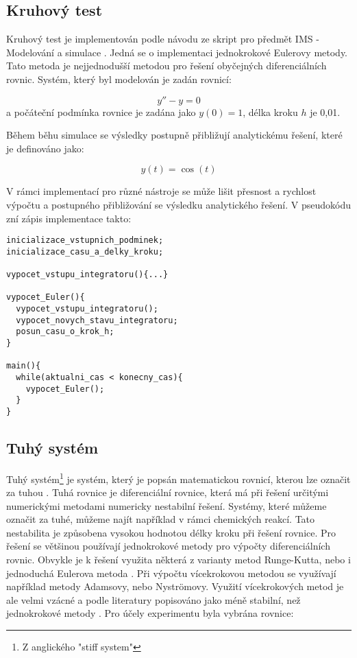 \subsection{Kruhový test}
\label{kruhovy-test}

Kruhový test je implementován podle návodu ze skript pro předmět IMS - Modelování a simulace \cite{IMS-skripta}. Jedná se o implementaci jednokrokové Eulerovy metody. Tato metoda je nejjednodušší metodou pro řešení obyčejných diferenciálních rovnic. Systém, který byl modelován je zadán rovnicí:

\begin{equation}
   y'' - y = 0 
\end{equation}
a počáteční podmínka rovnice je zadána jako $y(0) = 1$, délka kroku $h$ je 0,01.

Během běhu simulace se výsledky postupně přibližují analytickému řešení, které je definováno jako:

\begin{equation}
    y(t) = \cos(t)
\end{equation}


V rámci implementací pro různé nástroje se může lišit přesnost a rychlost výpočtu a postupného přibližování se výsledku analytického řešení. V pseudokódu zní zápis implementace takto:

\begin{lstlisting}
inicializace_vstupnich_podminek;
inicializace_casu_a_delky_kroku;

vypocet_vstupu_integratoru(){...}

vypocet_Euler(){
  vypocet_vstupu_integratoru();
  vypocet_novych_stavu_integratoru;
  posun_casu_o_krok_h;
}

main(){
  while(aktualni_cas < konecny_cas){
    vypocet_Euler();
  }
}
\end{lstlisting}



\subsection{Tuhý systém}
Tuhý systém\footnote{Z anglického "stiff system"} je systém, který je popsán matematickou rovnicí, kterou lze označit za tuhou \cite{hairer}. Tuhá rovnice je diferenciální rovnice, která má při řešení určitými numerickými metodami numericky nestabilní řešení. Systémy, které můžeme označit za tuhé, můžeme najít například v rámci chemických reakcí. Tato nestabilita je způsobena vysokou hodnotou délky kroku při řešení rovnice. Pro řešení se většinou používají jednokrokové metody pro výpočty diferenciálních rovnic. Obvykle je k řešení využita některá z varianty metod Runge-Kutta, nebo i jednoduchá Eulerova metoda \cite{IMS-skripta}. Při výpočtu vícekrokovou metodou se využívají například metody Adamsovy, nebo Nyströmovy. Využití vícekrokových metod je ale velmi vzácné a podle literatury popisováno jako méně stabilní, než jednokrokové metody \cite{hairer}. Pro účely experimentu byla vybrána rovnice:

